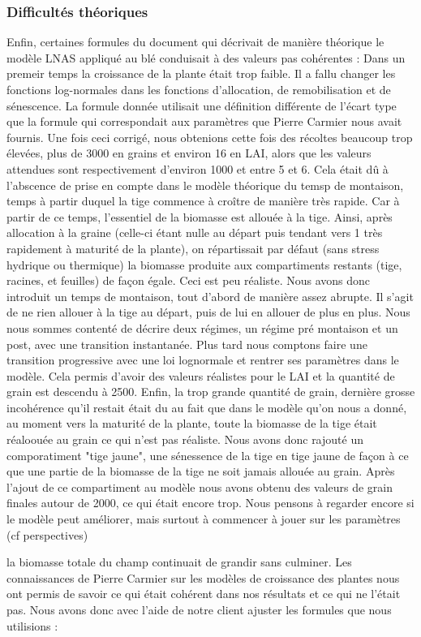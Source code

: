 \subsubsection{Difficultés théoriques}
Enfin, certaines formules du document qui décrivait de manière théorique le modèle LNAS appliqué au blé conduisait à des valeurs pas cohérentes : 
Dans un premeir temps la croissance de la plante était trop faible. Il a fallu changer les fonctions log-normales dans les fonctions d'allocation, de remobilisation et de sénescence.
La formule donnée utilisait une définition différente de l'écart type que la formule qui correspondait aux paramètres que Pierre Carmier nous avait fournis. 
Une fois ceci corrigé, nous obtenions cette fois des récoltes beaucoup trop élevées, plus de 3000 en grains et environ 16 en LAI, alors que les valeurs attendues sont respectivement d'environ 1000 et entre 5 et 6.
Cela était dû à l'abscence de prise en compte dans le modèle théorique du temsp de montaison, temps à partir duquel la tige commence à croître de manière très rapide. Car à partir de ce temps, l'essentiel de la biomasse est allouée à la tige.
Ainsi, après allocation à la graine (celle-ci étant nulle au départ puis tendant vers 1 très rapidement à maturité de la plante), on répartissait par défaut (sans stress hydrique ou thermique) la biomasse produite aux compartiments restants (tige, racines, et feuilles) de façon égale. Ceci est peu réaliste. Nous avons donc introduit un temps de montaison, tout d'abord de manière assez abrupte. Il s'agit de ne rien allouer à la tige au départ, puis de lui en allouer de plus en plus. Nous nous sommes contenté de décrire deux régimes, un régime pré montaison et un post, avec une transition instantanée. Plus tard nous comptons faire une transition progressive avec une loi lognormale et rentrer ses paramètres dans le modèle.
Cela permis d'avoir des valeurs réalistes pour le LAI et la quantité de grain est descendu à 2500.
Enfin, la trop grande quantité de grain, dernière grosse incohérence qu'il restait était du au fait que dans le modèle qu'on nous a donné, au moment vers la maturité de la plante, toute la biomasse de la tige était réaloouée au grain ce qui n'est pas réaliste. Nous avons donc rajouté un comporatiment "tige jaune", une sénessence de la tige en tige jaune de façon à ce que une partie de la biomasse de la tige ne soit jamais allouée au grain.
Après l'ajout de ce compartiment au modèle nous avons obtenu des valeurs de grain finales autour de 2000, ce qui était encore trop. 
Nous pensons à regarder encore si le modèle peut améliorer, mais surtout à commencer à jouer sur les paramètres (cf perspectives)
 
 la biomasse totale du champ continuait de grandir sans culminer. 
Les connaissances de Pierre Carmier sur les modèles de croissance des plantes nous ont permis de savoir ce qui était cohérent dans nos résultats et ce qui ne l'était pas. 
Nous avons donc avec l'aide de notre client ajuster les formules que nous utilisions :  






